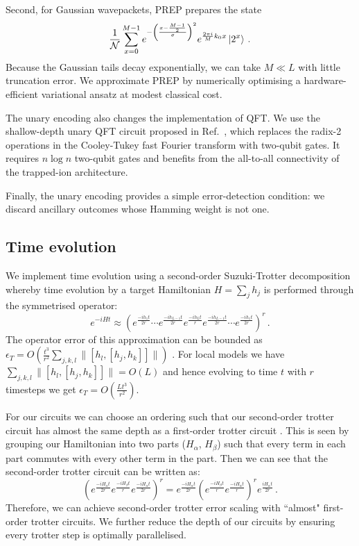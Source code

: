 Second, for Gaussian wavepackets, \textsc{PREP} prepares the state
\begin{equation}
    \frac{1}{\mathcal{N}}\sum_{x=0}^{M-1}e^{-\left(\frac{x-\frac{M-1}{2}}{\sigma}\right)^2}e^{\frac{2\pi i}{M}k_0 x} \ket{2^x}\,.
\end{equation}
Because the Gaussian tails decay exponentially, we can take $M\ll L$ with little truncation error. We approximate \textsc{PREP} by numerically optimising a hardware-efficient variational ansatz at modest classical cost.

The unary encoding also changes the implementation of \textsc{QFT}. We use the shallow-depth unary QFT circuit proposed in Ref.~\cite{jain2024quantum}, which replaces the radix-2 operations in the Cooley-Tukey fast Fourier transform \cite{cooleytukey} with two-qubit gates. It requires $n\log n$ two-qubit gates and benefits from the all-to-all connectivity of the trapped-ion architecture. 

Finally, the unary encoding provides a simple error-detection condition: we discard ancillary outcomes whose Hamming weight is not one.

\subsection{Time evolution}
We implement time evolution using a second-order Suzuki-Trotter decomposition \cite{suzuki1976generalized, suzuki1991general} whereby time evolution by a target Hamiltonian $H=\sum_j h_j$ is performed through the symmetrised operator:
\begin{equation}
   e^{-iHt} \approx \left(e^{\frac{ -ih_1 t}{2r}}\cdots e^{\frac{ -ih_{L-1} t}{2r}}e^{\frac{ -ih_L t}{r}} e^{\frac{ -ih_{L-1} t}{2r}}\cdots e^{\frac{ -ih_1 t}{2r}}\right)^r\,.
\end{equation}
The operator error of this approximation can be bounded as $\epsilon_T=O\left(\frac{t^3}{r^2}\sum_{j,k,l}\|[h_l,[h_j,h_k]]\|\right)$ \cite{childs2021theory}. For local models we have $\sum_{j,k,l}\|[h_l,[h_j,h_k]]\|=O(L)$ and hence evolving to time $t$ with $r$ timesteps we get $\epsilon_T=O\left(\frac{L t^3}{r^2}\right)$.

For our circuits we can choose an ordering such that our second-order trotter circuit has almost the same depth as a first-order trotter circuit \cite{layden2022first}. This is seen by grouping our Hamiltonian into two parts ($H_\alpha$, $H_\beta$) such that every term in each part commutes with every other term in the part. Then we can see that the second-order trotter circuit can be written as:
\begin{equation}
    \left(e^{\frac{ -iH_\alpha t}{2r}}e^{\frac{ -iH_\beta t}{r}} e^{\frac{ -iH_\alpha t}{2r}}\right)^r = e^{\frac{ -iH_\alpha t}{2r}}\left(e^{\frac{ -iH_\beta t}{r}} e^{\frac{ -iH_\alpha t}{r}}\right)^r e^{\frac{ iH_\alpha t}{2r}}\,.
\end{equation}
Therefore, we can achieve second-order trotter error scaling with ``almost" first-order trotter circuits. We further reduce the depth of our circuits by ensuring every trotter step is optimally parallelised.
